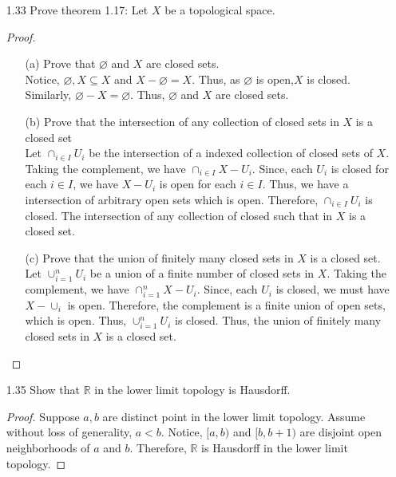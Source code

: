 \documentclass[12pt]{article}
\newcommand{\R}{\mathbb{R}}
\begin{document}
\begin{enumerate}
		\item[1.33] Prove theorem 1.17: Let $ X $ be a topological space.
		\begin{proof}
		\begin{enumerate}
			\item[(a)]Prove that $\varnothing$ and $X$ are closed sets.\\
			Notice, $ \varnothing,X \subseteq X $ and $ X-\varnothing = X $. Thus, as $\varnothing$ is open,$X$ is closed. Similarly, $ \varnothing - X = \varnothing $. Thus, $ \varnothing $ and $ X $ are closed sets.
			\item[(b)]Prove that the intersection of any collection of closed sets in $X$ is a closed set\\
			Let $ \cap_{i\in I} U_i $ be the intersection of a indexed collection of closed sets of $ X $. Taking the complement, we have $\cap_{i\in I} X-U_i  $. Since, each $ U_i $ is closed for each $ i\in I $, we have $ X-U_i $ is open for each $ i\in I $. Thus, we have a intersection of arbitrary open sets which is open. Therefore, $ \cap_{i\in I} U_i $ is closed. The intersection of any collection of closed such that in $ X $ is a closed set.
			\item[(c)]Prove that the union of finitely many closed sets in $X$ is a closed set.\\
			Let $ \cup_{i=1}^n U_i $ be a union of a finite number of closed sets in $X$. Taking the complement, we have $ \cap_{i=1}^n X-U_i $. Since, each $ U_i $ is closed, we must have $X-\cup_i $ is open. Therefore, the complement is a finite union of open sets, which is open. Thus, $ \cup_{i=1}^n U_i $ is closed. Thus, the union of finitely many closed sets in $ X $ is a closed set.
		\end{enumerate}
		\end{proof}
		\item[1.35] Show that $\mathbb { R }$ in the lower limit topology is Hausdorff.\\
		\begin{proof}
		Suppose $ a,b $ are distinct point in the lower limit topology. Assume without loss of generality, $ a<b $. Notice, $ [a,b) $ and $ [b,b+1) $ are disjoint open neighborhoods of $ a $ and $ b $. Therefore, $\R$ is Hausdorff in the lower limit topology.
		\end{proof}


\end{enumerate}
\end{document}
